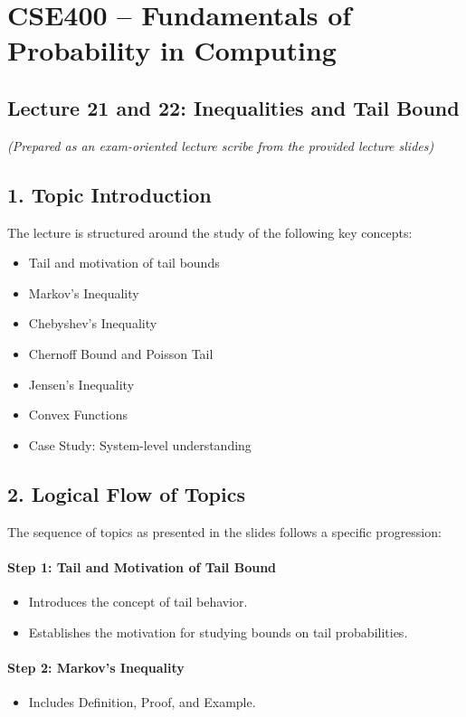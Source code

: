 \documentclass{article}
\begin{document}
\section*{CSE400 – Fundamentals of Probability in Computing}
\subsection*{Lecture 21 and 22: Inequalities and Tail Bound}
\textit{(Prepared as an exam-oriented lecture scribe from the provided lecture slides)}

\subsection*{1. Topic Introduction}
The lecture is structured around the study of the following key concepts:
\begin{itemize}
    \item Tail and motivation of tail bounds
    \item Markov’s Inequality
    \item Chebyshev’s Inequality
    \item Chernoff Bound and Poisson Tail
    \item Jensen’s Inequality
    \item Convex Functions
    \item Case Study: System-level understanding
\end{itemize}

\subsection*{2. Logical Flow of Topics}
The sequence of topics as presented in the slides follows a specific progression:

\paragraph{Step 1: Tail and Motivation of Tail Bound}
\begin{itemize}
    \item Introduces the concept of tail behavior.
    \item Establishes the motivation for studying bounds on tail probabilities.
\end{itemize}

\paragraph{Step 2: Markov’s Inequality}
\begin{itemize}
    \item Includes Definition, Proof, and Example.
\end{itemize}
\end{document}
